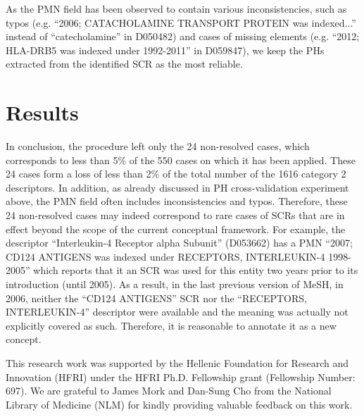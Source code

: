 As the PMN field has been observed to contain various inconsistencies, such as typos (e.g. ``2006; CATACHOLAMINE TRANSPORT PROTEIN was indexed...'' instead of ``catecholamine'' in D050482) and cases of missing elements (e.g. ``2012; HLA-DRB5 was indexed under 1992-2011'' in D059847), we keep the PHs extracted from the identified SCR as the most reliable. 

\section{Results}

In conclusion, the procedure left only the 24 non-resolved cases, which corresponds to less than 5\% of the 550 cases on which it has been applied. These 24 cases form a loss of less than 2\% of the total number of the 1616 category 2 descriptors. In addition, as already discussed in PH cross-validation experiment above, the PMN field often includes inconsistencies and typos. Therefore, these 24 non-resolved cases may indeed correspond to rare cases of SCRs that are in effect beyond the scope of the current conceptual framework. For example, the descriptor ``Interleukin-4 Receptor alpha Subunit'' (D053662) has a PMN ``2007; CD124 ANTIGENS was indexed under RECEPTORS, INTERLEUKIN-4 1998-2005'' which reports that it an SCR was used for this entity two years prior to its introduction (until 2005). As a result, in the last previous version of MeSH, in 2006, neither the ``CD124 ANTIGENS'' SCR nor the ``RECEPTORS, INTERLEUKIN-4'' descriptor were available and the meaning was actually not explicitly covered as such. Therefore, it is reasonable to annotate it as a new concept. 




\begin{acknowledgements}
This research work was supported by the Hellenic Foundation for Research and Innovation (HFRI) under the HFRI Ph.D. Fellowship grant (Fellowship Number: 697).
We are grateful to James Mork and Dan-Sung Cho from the National Library of Medicine (NLM) for kindly providing valuable feedback on this work.
\end{acknowledgements}


%
%



